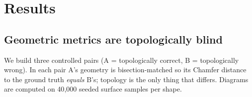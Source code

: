 \section{Results}
\label{sec:results}

\subsection{Geometric metrics are topologically blind}
\label{sec:results-blindness}

We build three controlled pairs (A = topologically correct, B = topologically
wrong). In each pair A's geometry is bisection-matched so its Chamfer distance to
the ground truth \emph{equals} B's; topology is the only thing that differs.
Diagrams are computed on 40{,}000 seeded surface samples per shape.

\begin{table}[h]
\centering
{}
\caption{Geometric metrics cannot separate topologically distinct
reconstructions, while the discriminating-dimension bottleneck does. Chamfer is
equal within each pair by construction; in cases i and ii Hausdorff-95 even
\emph{prefers} the wrong candidate. bottleneck$\to$GT is $\approx$40$\times$
(H0) and $\approx$35$\times$ (H2) larger for the wrong candidate.}
\label{tab:blindness}
\end{table}

